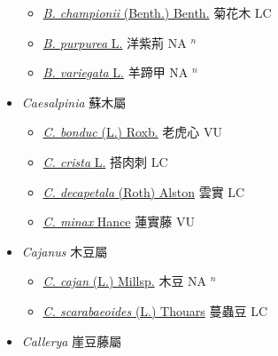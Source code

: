 \begin{itemize}
  \begin{itemize}
        \item[] \href{http://www.theplantlist.org/tpl1.1/search?q=Bauhinia+championii}{\textit{B. championii} (Benth.) Benth.}   菊花木 LC
        \item[] \href{http://www.theplantlist.org/tpl1.1/search?q=Bauhinia+purpurea}{\textit{B. purpurea} L.}   洋紫荊 NA $^n$
        \item[] \href{http://www.theplantlist.org/tpl1.1/search?q=Bauhinia+variegata}{\textit{B. variegata} L.}   羊蹄甲 NA $^n$
  \end{itemize}
 \item[] \textit{Caesalpinia} 蘇木屬
                    
  \begin{itemize}
        \item[] \href{http://www.theplantlist.org/tpl1.1/search?q=Caesalpinia+bonduc}{\textit{C. bonduc} (L.) Roxb.}   老虎心 VU
        \item[] \href{http://www.theplantlist.org/tpl1.1/search?q=Caesalpinia+crista}{\textit{C. crista} L.}   搭肉刺 LC
        \item[] \href{http://www.theplantlist.org/tpl1.1/search?q=Caesalpinia+decapetala}{\textit{C. decapetala} (Roth) Alston}   雲實 LC
        \item[] \href{http://www.theplantlist.org/tpl1.1/search?q=Caesalpinia+minax}{\textit{C. minax} Hance}   蓮實藤 VU
  \end{itemize}
 \item[] \textit{Cajanus} 木豆屬
                    
  \begin{itemize}
        \item[] \href{http://www.theplantlist.org/tpl1.1/search?q=Cajanus+cajan}{\textit{C. cajan} (L.) Millsp.}   木豆 NA $^n$
        \item[] \href{http://www.theplantlist.org/tpl1.1/search?q=Cajanus+scarabaeoides}{\textit{C. scarabaeoides} (L.) Thouars}   蔓蟲豆 LC
  \end{itemize}
 \item[] \textit{Callerya} 崖豆藤屬
                    

\end{itemize}
